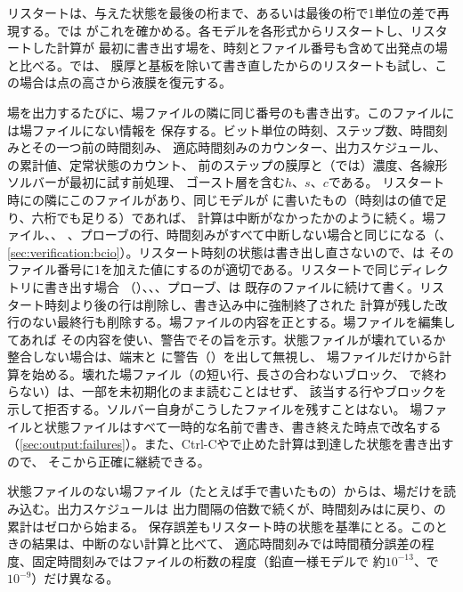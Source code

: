 リスタートは、与えた状態を最後の桁まで、あるいは最後の桁で1単位の差で再現する。では
がこれを確かめる。各モデルを各形式からリスタートし、リスタートした計算が
最初に書き出す場を、時刻とファイル番号も含めて出発点の場と比べる。では、
膜厚と基板を除いて書き直したからのリスタートも試し、この場合は点の高さから液膜を復元する。

場を出力するたびに、場ファイルの隣に同じ番号のも書き出す。このファイルには場ファイルにない情報を
保存する。ビット単位の時刻、ステップ数、時間刻みとその一つ前の時間刻み、
適応時間刻みのカウンター、出力スケジュール、の累計値、定常状態のカウント、
前のステップの膜厚と（では）濃度、各線形ソルバーが最初に試す前処理、
ゴースト層を含む$h$、$s$、$c$である。
リスタート時にの隣にこのファイルがあり、同じモデルが
に書いたもの（時刻はの値で足り、六桁でも足りる）であれば、
計算は中断がなかったかのように続く。場ファイル、、
、プローブの行、時間刻みがすべて中断しない場合と同じになる（、
\cref{sec:verification:bcio}）。リスタート時刻の状態は書き出し直さないので、は
そのファイル番号に1を加えた値にするのが適切である。リスタートで同じディレクトリに書き出す場合
（）、、、プローブ、は
既存のファイルに続けて書く。リスタート時刻より後の行は削除し、書き込み中に強制終了された
計算が残した改行のない最終行も削除する。場ファイルの内容を正とする。場ファイルを編集してあれば
その内容を使い、警告でその旨を示す。状態ファイルが壊れているか整合しない場合は、端末と
に警告（）を出して無視し、
場ファイルだけから計算を始める。壊れた場ファイル（の短い行、長さの合わないブロック、
で終わらない）は、一部を未初期化のまま読むことはせず、
該当する行やブロックを示して拒否する。ソルバー自身がこうしたファイルを残すことはない。
場ファイルと状態ファイルはすべて一時的な名前で書き、書き終えた時点で改名する
（\cref{sec:output:failures}）。また、Ctrl-Cやで止めた計算は到達した状態を書き出すので、
そこから正確に継続できる。

状態ファイルのない場ファイル（たとえば手で書いたもの）からは、場だけを読み込む。出力スケジュールは
出力間隔の倍数で続くが、時間刻みはに戻り、の累計はゼロから始まる。
保存誤差もリスタート時の状態を基準にとる。このときの結果は、中断のない計算と比べて、
適応時間刻みでは時間積分誤差の程度、固定時間刻みではファイルの桁数の程度（鉛直一様モデルで
約$10^{-13}$、で$10^{-9}$）だけ異なる。

